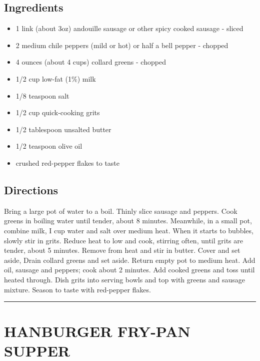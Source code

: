 \documentclass[
]{book}
\providecommand{\tightlist}{%
  \setlength{\itemsep}{0pt}\setlength{\parskip}{0pt}}
\begin{document}
\hypertarget{ingredients-58}{%
\subsection*{Ingredients}\label{ingredients-58}}


\begin{itemize}
\tightlist
\item
  1 link (about 3oz) andouille sausage or other spicy cooked sausage - sliced
\item
  2 medium chile peppers (mild or hot) or half a bell pepper - chopped
\item
  4 ounces (about 4 cups) collard greens - chopped
\item
  1/2 cup low-fat (1\%) milk
\item
  1/8 teaspoon salt
\item
  1/2 cup quick-cooking grits
\item
  1/2 tablespoon unsalted butter
\item
  1/2 teaspoon olive oil
\item
  crushed red-pepper flakes to taste
\end{itemize}

\hypertarget{directions-58}{%
\subsection*{Directions}\label{directions-58}}


Bring a large pot of water to a boil. Thinly slice sausage and peppers. Cook greens in boiling water until tender,
about 8 minutes. Meanwhile, in a small pot, combine milk, I cup water and salt over medium heat.
When it starts to bubbles, slowly stir in grits. Reduce heat to low and cook, stirring often,
until grits are tender, about 5 minutes. Remove from heat and stir in butter. Cover and set aside,
Drain collard greens and set aside. Return empty pot to medium heat. Add oil, sausage and peppers;
cook about 2 minutes. Add cooked greens and toss until heated through. Dish grits into serving bowls
and top with greens and sausage mixture. Season to taste with red-pepper flakes.

\begin{center}\rule{0.5\linewidth}{0.5pt}\end{center}

\hypertarget{hanburger-fry-pan-supper}{%
\section*{HANBURGER FRY-PAN SUPPER}\label{hanburger-fry-pan-supper}}
\end{document}
